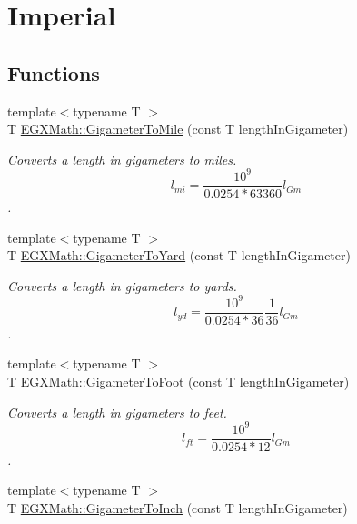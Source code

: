 \hypertarget{group___e_g_x_math-_conversions-_length_conversions-_s_i-_gigameter-_imperial}{}\section{Imperial}
\label{group___e_g_x_math-_conversions-_length_conversions-_s_i-_gigameter-_imperial}
\subsection*{Functions}
\begin{DoxyCompactItemize}
\item 
{\footnotesize template$<$typename T $>$ }\\T \mbox{\hyperlink{group___e_g_x_math-_conversions-_length_conversions-_s_i-_gigameter-_imperial_gab61b3324bc2080e5118924bffdd0d46d}{E\+G\+X\+Math\+::\+Gigameter\+To\+Mile}} (const T length\+In\+Gigameter)
\begin{DoxyCompactList}\small\item\em Converts a length in gigameters to miles. \[ l_{mi}=\frac{10^{9}}{0.0254 * 63360} l_{Gm} \]. \end{DoxyCompactList}\item 
{\footnotesize template$<$typename T $>$ }\\T \mbox{\hyperlink{group___e_g_x_math-_conversions-_length_conversions-_s_i-_gigameter-_imperial_gadc687ba83985120ec09d825adace01d6}{E\+G\+X\+Math\+::\+Gigameter\+To\+Yard}} (const T length\+In\+Gigameter)
\begin{DoxyCompactList}\small\item\em Converts a length in gigameters to yards. \[ l_{yd}= \frac{10^{9}}{0.0254 * 36} \frac{1}{36} l_{Gm} \]. \end{DoxyCompactList}\item 
{\footnotesize template$<$typename T $>$ }\\T \mbox{\hyperlink{group___e_g_x_math-_conversions-_length_conversions-_s_i-_gigameter-_imperial_gaeabf3c29bcb3076a8b41986debbf046b}{E\+G\+X\+Math\+::\+Gigameter\+To\+Foot}} (const T length\+In\+Gigameter)
\begin{DoxyCompactList}\small\item\em Converts a length in gigameters to feet. \[ l_{ft}= \frac{10^{9}}{0.0254 * 12} l_{Gm} \]. \end{DoxyCompactList}\item 
{\footnotesize template$<$typename T $>$ }\\T \mbox{\hyperlink{group___e_g_x_math-_conversions-_length_conversions-_s_i-_gigameter-_imperial_gacff04b5343e94d6e31e601578d190fb8}{E\+G\+X\+Math\+::\+Gigameter\+To\+Inch}} (const T length\+In\+Gigameter)

\end{DoxyCompactItemize}
